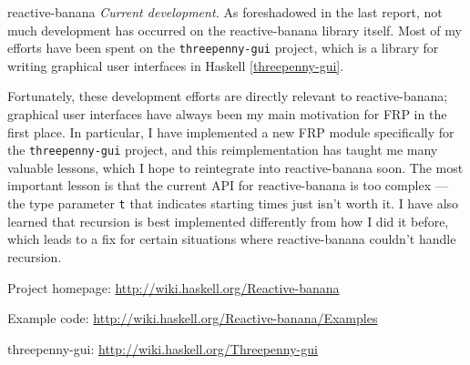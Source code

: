 \begin{hcarentry}[updated]{reactive-banana}
\emph{Current development.}
As foreshadowed in the last report, not much development has occurred on the reactive-banana library itself. Most of my efforts have been spent on the \verb`threepenny-gui` project, which is a library for writing graphical user interfaces in Haskell \cref{threepenny-gui}.

Fortunately, these development efforts are directly relevant to reactive-banana; graphical user interfaces have always been my main motivation for FRP in the first place. In particular, I have implemented a new FRP module specifically for the \verb`threepenny-gui` project, and this reimplementation has taught me many valuable lessons, which I hope to reintegrate into reactive-banana soon. The most important lesson is that the current API for reactive-banana is too complex --- the type parameter \verb!t! that indicates starting times just isn't worth it. I have also learned that recursion is best implemented differently from how I did it before, which leads to a fix for certain situations where reactive-banana couldn't handle recursion.

\FurtherReading
\begin{compactitem}
\item Project homepage: \url{http://wiki.haskell.org/Reactive-banana}
\item Example code: \url{http://wiki.haskell.org/Reactive-banana/Examples}
\item threepenny-gui: \url{http://wiki.haskell.org/Threepenny-gui}
\end{compactitem}
\end{hcarentry}
